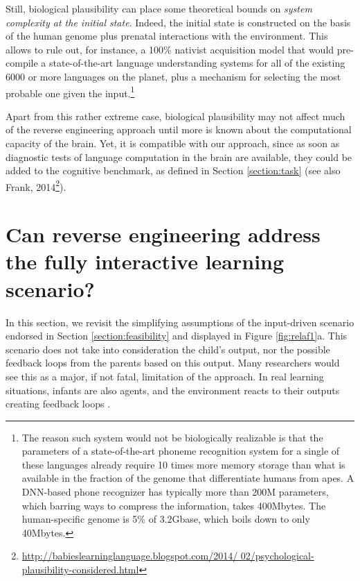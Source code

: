 \documentclass[jou,apacite]{apa6}
\begin{document}
Still, biological plausibility can place some theoretical bounds on \emph{system complexity at the initial state}. Indeed, the initial state is constructed on the basis of the human genome plus prenatal interactions with the environment. This allows to rule out, for instance, a 100\% nativist acquisition model that would pre-compile a state-of-the-art language understanding systems for all of the existing 6000 or more languages on the planet, plus a mechanism for selecting the most probable one given the input.\footnote{The reason such system would not be biologically realizable is that the parameters of a state-of-the-art phoneme recognition system for a single of these languages already require 10 times more memory storage than what is available in the fraction of the genome that differentiate humans from apes. A DNN-based phone recognizer has typically more than 200M parameters, which barring ways to compress the information, takes 400Mbytes. The human-specific genome is 5\% of 3.2Gbase, which boils down to only 40Mbytes.}

Apart from this rather extreme case, biological plausibility may not affect much of the reverse engineering approach until more is known about the computational capacity of the brain. Yet, it is compatible with our approach, since as soon as diagnostic tests of language computation in the brain are available, they could be added to the cognitive benchmark, as defined in Section \ref{section:task} (see also Frank, 2014\footnote{\url{http://babieslearninglanguage.blogspot.com/2014/ 02/psychological-plausibility-considered.html}}).


\section{Can reverse engineering address the fully interactive learning scenario?}\label{section:interactive}



In this section, we revisit the simplifying assumptions of the input-driven scenario endorsed in Section \ref{section:feasibility} and displayed in Figure \ref{fig:relaf1}a. This scenario does not take into consideration the child's output, nor the possible feedback loops from the parents based on this output. Many researchers would see this as a major, if not fatal, limitation of the approach. In real learning situations, infants are also agents, and the environment reacts to their outputs creating feedback loops \cite{bruner_ontogenesis_1975,bruner_childs_1983,macwhinney_87,snow_mothers_1972,tamis2008parents}. 
\end{document}
